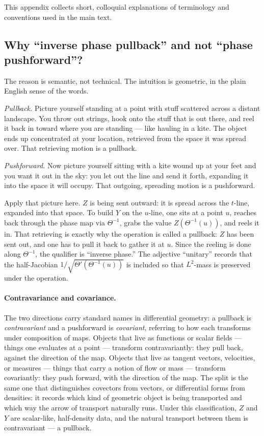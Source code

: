 \documentclass{article}
\newcommand{\tmem}[1]{{\em #1\/}}
\begin{document}
This appendix collects short, colloquial explanations of terminology and
conventions used in the main text.

\subsection{Why ``inverse phase pullback'' and not ``phase
pushforward''?}\label{app:pullback-vs-pushforward}

The reason is semantic, not technical. The intuition is geometric, in the
plain English sense of the words.

{\tmem{Pullback.}} Picture yourself standing at a point with stuff scattered
across a distant landscape. You throw out strings, hook onto the stuff that is
out there, and reel it back in toward where you are standing --- like hauling
in a kite. The object ends up concentrated at your location, retrieved from
the space it was spread over. That retrieving motion is a pullback.

{\tmem{Pushforward.}} Now picture yourself sitting with a kite wound up at
your feet and you want it out in the sky: you let out the line and send it
forth, expanding it into the space it will occupy. That outgoing, spreading
motion is a pushforward.

Apply that picture here. $Z$ is being sent outward: it is spread across the
$t$-line, expanded into that space. To build $Y$ on the $u$-line, one sits at
a point $u$, reaches back through the phase map via $\Theta^{- 1}$, grabs the
value $Z (\Theta^{- 1} (u))$, and reels it in. That retrieving is exactly why
the operation is called a pullback: $Z$ has been sent out, and one has to pull
it back to gather it at $u$. Since the reeling is done along $\Theta^{- 1}$,
the qualifier is ``inverse phase.'' The adjective ``unitary'' records that the
half-Jacobian $1 / \sqrt{\Theta' (\Theta^{- 1} (u))}$ is included so that
$L^2$-mass is preserved under the operation.

\paragraph{Contravariance and covariance.} The two directions carry standard
names in differential geometry: a pullback is {\tmem{contravariant}} and a
pushforward is {\tmem{covariant}}, referring to how each transforms under
composition of maps. Objects that live as functions or scalar fields ---
things one evaluates at a point --- transform contravariantly: they pull back,
against the direction of the map. Objects that live as tangent vectors,
velocities, or measures --- things that carry a notion of flow or mass ---
transform covariantly: they push forward, with the direction of the map. The
split is the same one that distinguishes covectors from vectors, or
differential forms from densities: it records which kind of geometric object
is being transported and which way the arrow of transport naturally runs.
Under this classification, $Z$ and $Y$ are scalar-like, half-density data, and
the natural transport between them is contravariant --- a pullback.
\end{document}
